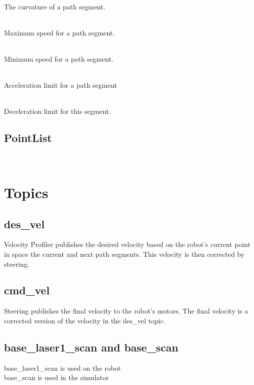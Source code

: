 \\
\indent The curvature of a path segment.

\\
\indent Maximum speed for a path segment.

\\
\indent Minimum speed for a path segment.

\\
\indent Acceleration limit for a path segment 

\\
\indent Deceleration limit for this segment.

\subsection{PointList}
\\






\section{Topics}

\subsection{des\_vel}
Velocity Profiler publishes the desired velocity based on the robot's
current point in space the current and next path segments.  This
velocity is then corrected by steering.

\subsection{cmd\_vel}
Steering publishes the final velocity to the robot's motors.  The
final velocity is a corrected version of the velocity in the des\_vel topic.

\subsection{base\_laser1\_scan and base\_scan}
base\_laser1\_scan is used on the robot\\
base\_scan is used in the simulator\\

